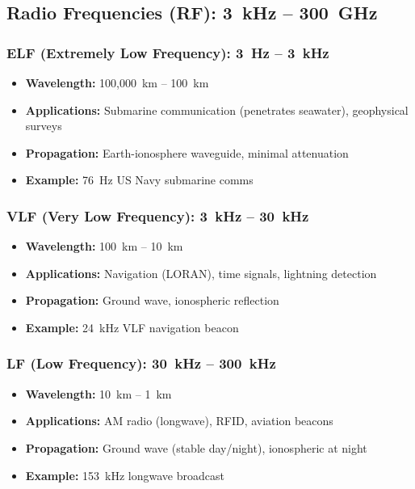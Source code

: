 \subsection{Radio Frequencies (RF): 3~kHz -- 300~GHz}

\subsubsection{ELF (Extremely Low Frequency): 3~Hz -- 3~kHz}

\begin{itemize}
\item \textbf{Wavelength:} 100,000~km -- 100~km
\item \textbf{Applications:} Submarine communication (penetrates seawater), geophysical surveys
\item \textbf{Propagation:} Earth-ionosphere waveguide, minimal attenuation
\item \textbf{Example:} 76~Hz US Navy submarine comms
\end{itemize}

\subsubsection{VLF (Very Low Frequency): 3~kHz -- 30~kHz}

\begin{itemize}
\item \textbf{Wavelength:} 100~km -- 10~km
\item \textbf{Applications:} Navigation (LORAN), time signals, lightning detection
\item \textbf{Propagation:} Ground wave, ionospheric reflection
\item \textbf{Example:} 24~kHz VLF navigation beacon
\end{itemize}

\subsubsection{LF (Low Frequency): 30~kHz -- 300~kHz}

\begin{itemize}
\item \textbf{Wavelength:} 10~km -- 1~km
\item \textbf{Applications:} AM radio (longwave), RFID, aviation beacons
\item \textbf{Propagation:} Ground wave (stable day/night), ionospheric at night
\item \textbf{Example:} 153~kHz longwave broadcast
\end{itemize}

